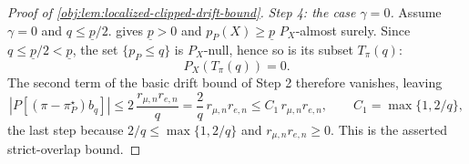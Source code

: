 \begin{proof}[Proof of \cref{obj:lem:localized-clipped-drift-bound}]
\emph{Step 4: the case \(\gamma=0\).}  Assume \(\gamma=0\) and \(q\le\underline p/2\).   gives \(\underline p>0\) and \(p_P(X)\ge\underline p\) \(P_X\)-almost surely.  Since \(q\le\underline p/2<\underline p\), the set \(\{p_P\le q\}\) is \(P_X\)-null, hence so is its subset \(T_\pi(q)\):
\[
P_X\!\left(T_\pi(q)\right)=0 .
\]
The second term of the basic drift bound of Step 2 therefore vanishes, leaving
\[
\left|P\!\left[(\pi-\pi^\star_P)b_q\right]\right|
\le
2\,\frac{r_{\mu,n}r_{e,n}}{q}
=
\frac2q\,r_{\mu,n}r_{e,n}
\le
C_1\,r_{\mu,n}r_{e,n},
\qquad
C_1=\max\{1,2/q\},
\]
the last step because \(2/q\le\max\{1,2/q\}\) and \(r_{\mu,n}r_{e,n}\ge0\).  This is the asserted strict-overlap bound. %
\end{proof}
